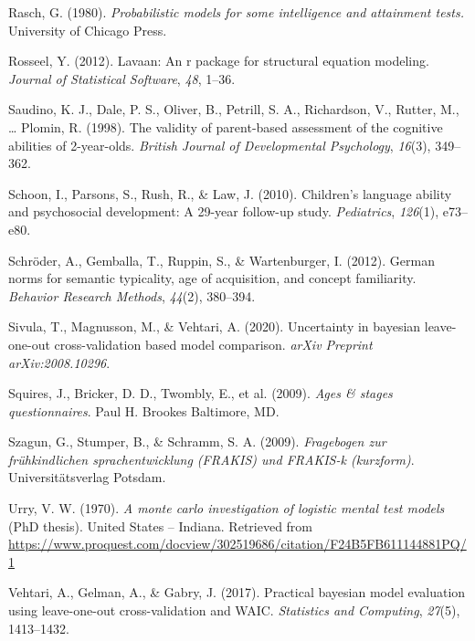 \documentclass[
  man,floatsintext]{apa6}
\newlength{\cslhangindent}
\newlength{\cslentryspacingunit} %
\newenvironment{CSLReferences}[2] %
 {%
  \setlength{\parindent}{0pt}
  \ifodd #1
  \let\oldpar\par
  \def\par{\hangindent=\cslhangindent\oldpar}
  \fi
  \setlength{\parskip}{#2\cslentryspacingunit}
 }%
 {}
\begin{document}
\begin{CSLReferences}{1}{0}
\leavevmode{}%
Rasch, G. (1980). \emph{Probabilistic models for some intelligence and attainment tests.} University of Chicago Press.

\leavevmode{}%
Rosseel, Y. (2012). Lavaan: An r package for structural equation modeling. \emph{Journal of Statistical Software}, \emph{48}, 1--36.

\leavevmode{}%
Saudino, K. J., Dale, P. S., Oliver, B., Petrill, S. A., Richardson, V., Rutter, M., \ldots{} Plomin, R. (1998). The validity of parent-based assessment of the cognitive abilities of 2-year-olds. \emph{British Journal of Developmental Psychology}, \emph{16}(3), 349--362.

\leavevmode{}%
Schoon, I., Parsons, S., Rush, R., \& Law, J. (2010). Children's language ability and psychosocial development: A 29-year follow-up study. \emph{Pediatrics}, \emph{126}(1), e73--e80.

\leavevmode{}%
Schröder, A., Gemballa, T., Ruppin, S., \& Wartenburger, I. (2012). German norms for semantic typicality, age of acquisition, and concept familiarity. \emph{Behavior Research Methods}, \emph{44}(2), 380--394.

\leavevmode{}%
Sivula, T., Magnusson, M., \& Vehtari, A. (2020). Uncertainty in bayesian leave-one-out cross-validation based model comparison. \emph{arXiv Preprint arXiv:2008.10296}.

\leavevmode{}%
Squires, J., Bricker, D. D., Twombly, E., et al. (2009). \emph{Ages \& stages questionnaires}. Paul H. Brookes Baltimore, MD.

\leavevmode{}%
Szagun, G., Stumper, B., \& Schramm, S. A. (2009). \emph{Fragebogen zur fr{ü}hkindlichen sprachentwicklung (FRAKIS) und FRAKIS-k (kurzform)}. Universitätsverlag Potsdam.

\leavevmode{}%
Urry, V. W. (1970). \emph{A monte carlo investigation of logistic mental test models} (PhD thesis). United States -- Indiana. Retrieved from \url{https://www.proquest.com/docview/302519686/citation/F24B5FB611144881PQ/1}

\leavevmode{}%
Vehtari, A., Gelman, A., \& Gabry, J. (2017). Practical bayesian model evaluation using leave-one-out cross-validation and WAIC. \emph{Statistics and Computing}, \emph{27}(5), 1413--1432.


\end{CSLReferences}
\end{document}
